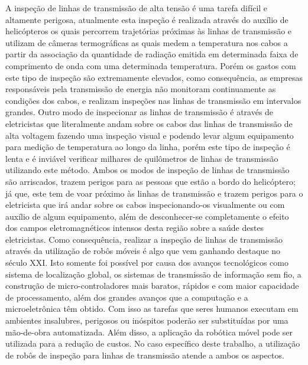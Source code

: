 A inspeção de linhas de transmissão de alta tensão é uma tarefa difícil e altamente perigosa, atualmente esta inspeção é realizada através do auxílio de helicópteros os quais percorrem trajetórias próximas às linhas de transmissão e utilizam de câmeras termográficas as quais medem a temperatura nos cabos a partir da associação da quantidade de radiação emitida em determinada faixa de comprimento de onda com uma determinada temperatura. Porém os gastos com este tipo de inspeção são extremamente elevados, como consequência, as empresas responsáveis pela transmissão de energia não monitoram continuamente as condições dos cabos, e realizam inspeções nas linhas de transmissão em intervalos grandes. Outro modo de inspecionar as linhas de transmissão é através de eletricistas que literalmente andam sobre os cabos das linhas de transmissão de alta voltagem fazendo uma inspeção visual e podendo levar algum equipamento para medição de temperatura ao longo da linha, porém este tipo de inspeção é lenta e é inviável verificar milhares de quilômetros de linhas de transmissão utilizando este método.
Ambos os modos de inspeção de linhas de transmissão são arriscados, trazem perigos para as pessoas que estão a bordo do helicóptero; já que, este tem de voar próximo às linhas de transmissão e trazem perigos para o eletricista que irá andar sobre os cabos inspecionando-os visualmente ou com auxílio de algum equipamento, além de desconhecer-se completamente o efeito dos campos eletromagnéticos intensos desta região sobre a saúde destes eletricistas. Como consequência, realizar a inspeção de linhas de transmissão através da utilização de robôs móveis é algo que vem ganhando destaque no século XXI. Isto somente foi possível por causa dos avanços tecnológicos como sistema de localização global, os sistemas de transmissão de informação sem fio, a construção de micro-controladores mais baratos, rápidos e com maior capacidade de processamento, além dos grandes avanços que a computação e a microeletrônica têm obtido. Com isso as tarefas que seres humanos executam em ambientes insalubres, perigosos ou inóspitos poderão ser substituídas por uma mão-de-obra automatizada. Além disso, a aplicação da robótica móvel pode ser utilizada para a redução de custos.  No caso específico deste trabalho, a utilização de robôs de inspeção para linhas de transmissão atende a ambos os aspectos.
